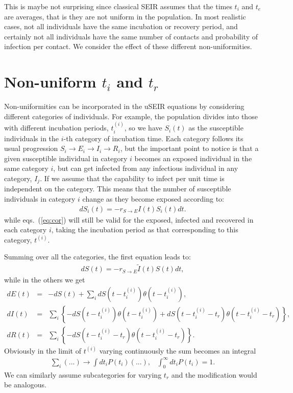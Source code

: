 \documentclass[a4paper,oneside,11pt]{article}
\begin{document}
  This is maybe not surprising since classical SEIR assumes that the times $t_i$ and $t_e$ are averages, that is they are not uniform in the population. In most realistic cases, not all individuals have the same incubation or recovery period, and certainly not all individuals have the same number of contacts and probability of infection per contact. We consider the effect of these different non-uniformities.
   
\section{Non-uniform $t_i$ and $t_r$ }

 Non-uniformities can be incorporated in the uSEIR equations by considering different categories of individuals. For example, the population divides   into those with different incubation periods, $t_i^{(i)}$, so we have $S_i(t)$ as the susceptible individuals in the $i$-th category of incubation time. Each category follows its usual progression $S_i\rightarrow E_i \rightarrow I_i \rightarrow R_i$, but the important point to notice is that a given susceptible individual in category $i$ becomes an exposed individual in the same category $i$, but can get infected from any infectious individual in any category, $I_j$. If we assume that the capability to infect per unit time is independent on the category. This means that the number of susceptible individuals in category $i$ change as they become exposed according to:
\begin{eqnarray}
d S_i(t) = - r_{S\rightarrow E} I(t) S_i(t) dt.
\end{eqnarray}
while eqs.~(\ref{eq:cor}) will still be valid for the exposed, infected and recovered in each category $i$, taking the incubation period as that corresponding to this category, $t^{(i)}$. 

Summing over all the categories, the first equation leads to:
\begin{eqnarray}
d S(t) = - r_{S\rightarrow E} \tilde{I}(t) S(t) dt, 
\end{eqnarray}
while in the others we get
\begin{eqnarray}
d E(t) &=& -d S(t) + \sum_i d S(t-t^{(i)}_i) \theta(t-t^{(i)}_i) ,\nonumber\\
d I(t) &=& \sum_i  \left\{-d S(t-t^{(i)}_i) \theta(t-t^{(i)}_i)+ d S(t-t^{(i)}_i-t_r) \theta(t-t^{(i)}_i-t_r)\right\},\nonumber\\
d R(t) &=& \sum_i \left\{- d S(t - t^{(i)}_i - t_r) \theta(t-t^{(i)}_i-t_r)\right\}.\nonumber
\label{eqs:corint}
\end{eqnarray}
Obviously in the limit of $t^{(i)}$ varying continuously the sum becomes an integral
\begin{eqnarray}
\sum_i  (...) \rightarrow \int dt_i P(t_i) (...), \;\;\; \int_0^\infty dt_i P(t_i) = 1.
\end{eqnarray}
We can similarly assume subcategories for varying $t_r$ and the modification would be analogous. 
\end{document}
